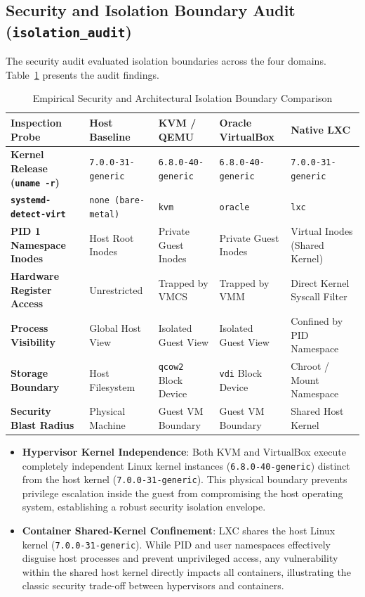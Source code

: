 \subsection{Security and Isolation Boundary Audit (\texttt{isolation\_audit})}
\label{subsec:results_isolation}

The security audit evaluated isolation boundaries across the four domains. Table~\ref{tab:results_isolation} presents the audit findings.

\begin{table}[t]
\centering
\small
\caption{Empirical Security and Architectural Isolation Boundary Comparison}
\label{tab:results_isolation}
\begin{tabularx}{\textwidth}{>{\raggedright\arraybackslash}p{3.2cm}>{\raggedright\arraybackslash}X>{\raggedright\arraybackslash}X>{\raggedright\arraybackslash}X>{\raggedright\arraybackslash}X}
\toprule
\textbf{Inspection Probe} & \textbf{Host Baseline} & \textbf{KVM / QEMU} & \textbf{Oracle VirtualBox} & \textbf{Native LXC} \\
\midrule
\textbf{Kernel Release (\texttt{uname -r})} & \texttt{7.0.0-31-generic} & \texttt{6.8.0-40-generic} & \texttt{6.8.0-40-generic} & \texttt{7.0.0-31-generic} \\
\textbf{\texttt{systemd-detect-virt}} & \texttt{none (bare-metal)} & \texttt{kvm} & \texttt{oracle} & \texttt{lxc} \\
\textbf{PID 1 Namespace Inodes} & Host Root Inodes & Private Guest Inodes & Private Guest Inodes & Virtual Inodes (Shared Kernel) \\
\textbf{Hardware Register Access} & Unrestricted & Trapped by VMCS & Trapped by VMM & Direct Kernel Syscall Filter \\
\textbf{Process Visibility} & Global Host View & Isolated Guest View & Isolated Guest View & Confined by PID Namespace \\
\textbf{Storage Boundary} & Host Filesystem & \texttt{qcow2} Block Device & \texttt{vdi} Block Device & Chroot / Mount Namespace \\
\textbf{Security Blast Radius} & Physical Machine & Guest VM Boundary & Guest VM Boundary & Shared Host Kernel \\
\bottomrule
\end{tabularx}
\end{table}

\begin{itemize}
    \item \textbf{Hypervisor Kernel Independence}: Both KVM and VirtualBox execute completely independent Linux kernel instances (\texttt{6.8.0-40-generic}) distinct from the host kernel (\texttt{7.0.0-31-generic}). This physical boundary prevents privilege escalation inside the guest from compromising the host operating system, establishing a robust security isolation envelope.
    \item \textbf{Container Shared-Kernel Confinement}: LXC shares the host Linux kernel (\texttt{7.0.0-31-generic}). While PID and user namespaces effectively disguise host processes and prevent unprivileged access, any vulnerability within the shared host kernel directly impacts all containers, illustrating the classic security trade-off between hypervisors and containers.
\end{itemize}
